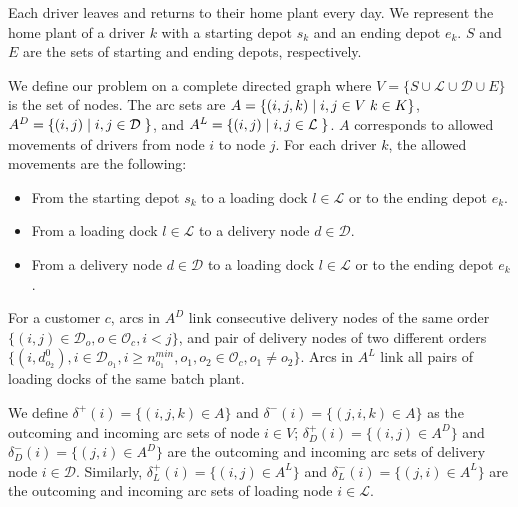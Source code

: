 \documentclass{article}
\begin{document}
Each driver leaves and returns to their home plant every day. We represent the home plant of a driver $k$ with a starting depot $s_k$ and an ending depot $e_k$. $S$ and $E$ are the sets of starting and ending depots, respectively.

We define our problem on a complete directed graph where $V=\{ S \cup \mathcal{L} \cup \mathcal{D} \cup E\}$ is the set of nodes. The arc sets are $A =  \{(i,j,k) \hspace*{1mm} \vert \hspace*{1mm} i, j \in V \hspace{1mm} k\in K \}$, $A^D = \{(i,j) \hspace*{1mm} \vert \hspace*{1mm} i, j \in \mathcal{D} \hspace{1mm} \}$, and $A^L = \{(i,j) \hspace*{1mm} \vert \hspace*{1mm} i, j \in \mathcal{L} \hspace{1mm} \}$.
$A$ corresponds to allowed movements of drivers from node $i$ to node $j$. For each driver $k$, the allowed movements are the following:

\begin{itemize}
    \item From the starting depot $s_k$ to a loading dock $l \in \mathcal{L}$ or to the ending depot $e_k$.
    \item From a loading dock $l \in \mathcal{L}$ to a delivery node $d \in \mathcal{D}$.
    \item From a delivery node  $d \in \mathcal{D}$ to a loading dock $l \in \mathcal{L}$ or to the ending depot $e_k$.
\end{itemize}

For a customer $c$, arcs in $A^D$ link consecutive delivery nodes of the same order   $\lbrace (i,j)\in \mathcal{D}_o, o \in \mathcal{O}_c, i < j  \rbrace$, and pair of delivery nodes of two different orders $ \lbrace (i,d^{0}_{o_2}),  i \in \mathcal{D}_{o_1}, i \geq n^{min}_{o_1}, o_1, o_2 \in \mathcal{O}_c, o_1 \neq o_2 \rbrace $. Arcs in $A^L$ link all pairs of loading docks of the same batch plant.

We define $\delta^{+}(i) = \{(i, j,k) \in A \}$ and $\delta^{-}(i) = \{(j, i,k) \in A \}$ as the outcoming and incoming arc sets of node $i \in V$; $\delta^{+}_D(i) = \{(i, j)  \in A^D\}$ and $\delta^{-}_D(i) = \{(j, i) \in A^D \}$ are the outcoming and incoming arc sets of delivery node $i \in \mathcal{D}$.  Similarly, $\delta^{+}_L(i) = \{(i, j)  \in A^L\}$ and $\delta^{-}_L(i) = \{(j, i) \in A^L \}$ are the outcoming and incoming arc sets of loading node $i \in \mathcal{L}$.
\end{document}
